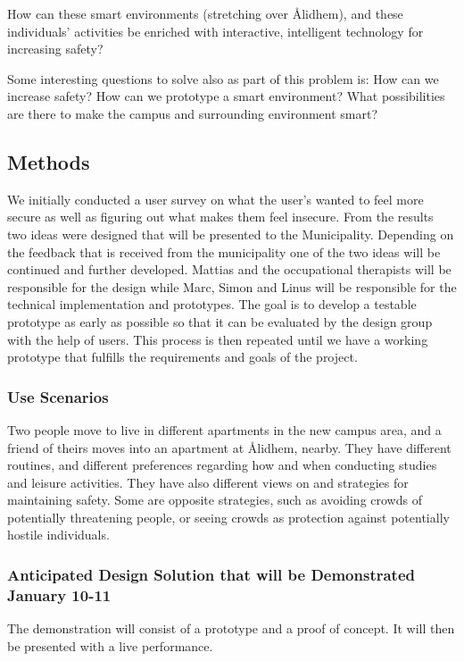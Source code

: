 \documentclass[twoside]{report}
\begin{document}
How can these smart environments (stretching over Ålidhem), and these
individuals’ activities be enriched with interactive, intelligent technology
for increasing safety? 

Some interesting questions to solve also as part of this
problem is: How can we increase safety? How can we prototype a smart
environment? What possibilities are there to make the campus and surrounding
environment smart? 

\subsection{Methods}

We initially conducted a user survey on what the user’s wanted to feel more
secure as well as figuring out what makes them feel insecure. From the results
two ideas were designed that will be presented to the Municipality. Depending on
the feedback that is received from the municipality one of the two ideas will be
continued and further developed. Mattias and the occupational therapists will be
responsible for the design while Marc, Simon and Linus will be responsible for
the technical implementation and prototypes. The goal is to develop a testable
prototype as early as possible so that it can be evaluated by the design group
with the help of users. This process is then repeated until we have a working
prototype that fulfills the requirements and goals of the project. 

\subsubsection{Use Scenarios}

Two people move to live in different apartments in the new campus area, and a
friend of theirs moves into an apartment at Ålidhem, nearby. They have different
routines, and different preferences regarding how and when conducting studies
and leisure activities. They have also different views on and strategies for
maintaining safety. Some are opposite strategies, such as avoiding crowds of
potentially threatening people, or seeing crowds as protection against
potentially hostile individuals.

\subsubsection{Anticipated Design Solution that will be Demonstrated January 10-11}

The demonstration will consist of a prototype and a proof of concept. It will then be presented with a live performance.  
\end{document}
